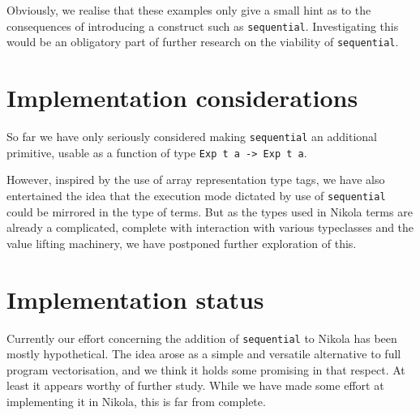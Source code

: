 Obviously, we realise that these examples only give a small hint as to the
consequences of introducing a construct such as \texttt{sequential}.
Investigating this would be an obligatory part of further research on the
viability of \texttt{sequential}.

\section{Implementation considerations}

So far we have only seriously considered making \texttt{sequential} an
additional primitive, usable as a function of type \texttt{Exp t a -> Exp t a}.

However, inspired by the use of array representation type tags, we have also
entertained the idea that the execution mode dictated by use of
\texttt{sequential} could be mirrored in the type of terms. But as the types
used in Nikola terms are already a complicated, complete with interaction with
various typeclasses and the value lifting machinery, we have postponed further
exploration of this.

\section{Implementation status}

Currently our effort concerning the addition of \texttt{sequential} to Nikola
has been mostly hypothetical. The idea arose as a simple and versatile
alternative to full program vectorisation, and we think it holds some promising
in that respect. At least it appears worthy of further study.  While we have
made some effort at implementing it in Nikola, this is far from complete.
